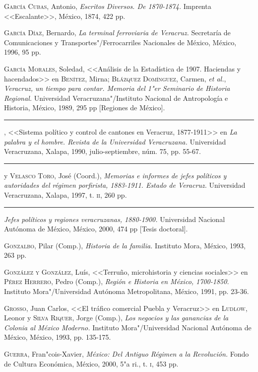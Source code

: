 \documentclass[14pt,twoside,final]{extbook} %
\begin{document}
\textsc{García Cubas}, Antonio, \emph{Escritos Diversos. De 1870-1874.} Imprenta <<Escalante>>, México, 1874, 422 pp.

\textsc{García Díaz}, Bernardo, \emph{La terminal ferroviaria de Veracruz.} Secretaría de Comunicaciones y Transportes"/Ferrocarriles Nacionales de México, México, 1996, 95 pp.

\textsc{García Morales}, Soledad, <<Análisis de la Estadística de 1907. Haciendas y
hacendados>> en \textsc{Benítez}, Mirna; \textsc{Blázquez Domínguez}, Carmen,
\emph{et al.}, \emph{Veracruz, un tiempo para contar. Memoria del 1"er Seminario de Historia Regional.} Universidad Veracruzana"/Instituto Nacional de Antropología e Historia, México, 1989, 295 pp [Regiones de México].

\rule{1cm}{0.4pt}, <<Sistema político y control de cantones en Veracruz, 1877-1911>> en \emph{La palabra y el hombre. Revista de la Universidad Veracruzana.} Universidad Veracruzana, Xalapa, 1990, julio-septiembre, núm. 75, pp. 55-67.

\rule{1cm}{0.4pt} y \textsc{Velasco Toro}, José (Coord.), \emph{Memorias e informes de jefes políticos y autoridades del régimen porfirista, 1883-1911. Estado de Veracruz.} Universidad
Veracruzana, Xalapa, 1997, t. \textsc{ii}, 260 pp.

\rule{1cm}{0.4pt} \emph{Jefes políticos y regiones veracruzanas, 1880-1900.} Universidad Nacional Autónoma de México, México, 2000, 474 pp [Tesis doctoral].

\textsc{Gonzalbo}, Pilar (Comp.), \emph{Historia de la familia.} Instituto Mora, México, 1993, 263 pp.

\textsc{González y González}, Luís, <<Terruño, microhistoria y ciencias sociales>> en \textsc{Pérez Herrero}, Pedro (Comp.), \emph{Región e Historia en México, \mbox{1700-1850}.} Instituto Mora"/Universidad Autónoma Metropolitana, México, 1991, pp. 23-36.

\textsc{Grosso}, Juan Carlos, <<El tráfico comercial Puebla y Veracruz>> en \textsc{Ludlow}, Leonor y \textsc{Silva Riquer}, Jorge (Comp.), \emph{Los negocios y las ganancias de la Colonia al México Moderno.} Instituto Mora"/Universidad Nacional Autónoma de México, México, 1993, pp. 135-175.

\textsc{Guerra}, Fran"cois-Xavier, \emph{México: Del Antiguo Régimen a la Revolución.} Fondo de Cultura Económica, México, 2000, 5"a ri., t. \textsc{i}, 453 pp.
\end{document}
